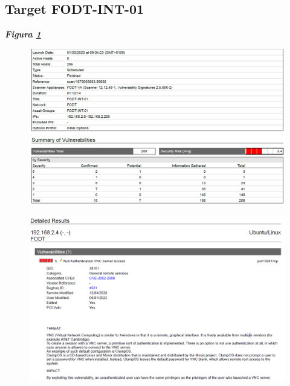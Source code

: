 \documentclass[target=bach,aauheader=]{thud}
\begin{document}
\subsection{Target FODT-INT-01} \textbf{\textit{Figura \ref{fig:fodt-int-01_1}}} \label{fodt-int-01}


\begin{figure}[t]
    \centering
    \includegraphics[width=1\linewidth]{images/FODT-INT-01_1.png}
    \caption{}
    \label{fig:fodt-int-01_1}
\end{figure}


\begin{figure}[t]
    \centering
    \includegraphics[width=1\linewidth]{images/FODT-INT-01_2.png}
    \caption{}
    \label{fig:fodt-int-01_2}
\end{figure}
\end{document}
